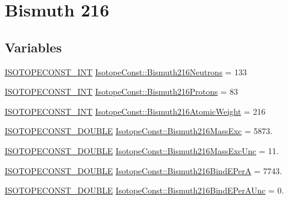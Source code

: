 \hypertarget{group___isotope_const-_bismuth-_bi216}{}\section{Bismuth 216}
\label{group___isotope_const-_bismuth-_bi216}
\subsection*{Variables}
\begin{DoxyCompactItemize}
\item 
\mbox{\hyperlink{group___isotope_const-_macros_ga5f18360b3e99483a35c32d789e62621c}{I\+S\+O\+T\+O\+P\+E\+C\+O\+N\+S\+T\+\_\+\+I\+NT}} \mbox{\hyperlink{group___isotope_const-_bismuth-_bi216_ga498f15c14bc8608ff9688eef8747a82c}{Isotope\+Const\+::\+Bismuth216\+Neutrons}} = 133
\item 
\mbox{\hyperlink{group___isotope_const-_macros_ga5f18360b3e99483a35c32d789e62621c}{I\+S\+O\+T\+O\+P\+E\+C\+O\+N\+S\+T\+\_\+\+I\+NT}} \mbox{\hyperlink{group___isotope_const-_bismuth-_bi216_gac7f6441b24100bfafe7c7d7e59c37025}{Isotope\+Const\+::\+Bismuth216\+Protons}} = 83
\item 
\mbox{\hyperlink{group___isotope_const-_macros_ga5f18360b3e99483a35c32d789e62621c}{I\+S\+O\+T\+O\+P\+E\+C\+O\+N\+S\+T\+\_\+\+I\+NT}} \mbox{\hyperlink{group___isotope_const-_bismuth-_bi216_ga4b7df9137e68b1bc1487dc4d0d1e9548}{Isotope\+Const\+::\+Bismuth216\+Atomic\+Weight}} = 216
\item 
\mbox{\hyperlink{group___isotope_const-_macros_ga8f45a7272ce02c0b4c65c44636ed719a}{I\+S\+O\+T\+O\+P\+E\+C\+O\+N\+S\+T\+\_\+\+D\+O\+U\+B\+LE}} \mbox{\hyperlink{group___isotope_const-_bismuth-_bi216_gaece2504face1daeed56f19d32ebba6fe}{Isotope\+Const\+::\+Bismuth216\+Mass\+Exc}} = 5873.
\item 
\mbox{\hyperlink{group___isotope_const-_macros_ga8f45a7272ce02c0b4c65c44636ed719a}{I\+S\+O\+T\+O\+P\+E\+C\+O\+N\+S\+T\+\_\+\+D\+O\+U\+B\+LE}} \mbox{\hyperlink{group___isotope_const-_bismuth-_bi216_gaadf3854760f7231c46fa422815407716}{Isotope\+Const\+::\+Bismuth216\+Mass\+Exc\+Unc}} = 11.
\item 
\mbox{\hyperlink{group___isotope_const-_macros_ga8f45a7272ce02c0b4c65c44636ed719a}{I\+S\+O\+T\+O\+P\+E\+C\+O\+N\+S\+T\+\_\+\+D\+O\+U\+B\+LE}} \mbox{\hyperlink{group___isotope_const-_bismuth-_bi216_ga4cf59923f5e068821f193a182ab2cc43}{Isotope\+Const\+::\+Bismuth216\+Bind\+E\+PerA}} = 7743.
\item 
\mbox{\hyperlink{group___isotope_const-_macros_ga8f45a7272ce02c0b4c65c44636ed719a}{I\+S\+O\+T\+O\+P\+E\+C\+O\+N\+S\+T\+\_\+\+D\+O\+U\+B\+LE}} \mbox{\hyperlink{group___isotope_const-_bismuth-_bi216_ga7070136de6e6a7a364207ca34bd76fb7}{Isotope\+Const\+::\+Bismuth216\+Bind\+E\+Per\+A\+Unc}} = 0.

\end{DoxyCompactItemize}
